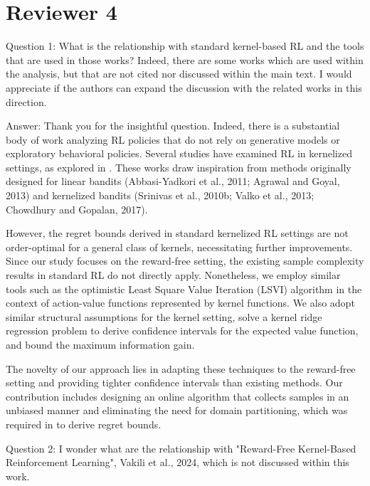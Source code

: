 \documentclass{article}
\begin{document}
\section*{Reviewer 4}

Question 1: What is the relationship with standard kernel-based RL and the tools that are used in those works? Indeed, there are some works which are used within the analysis, but that are not cited nor discussed within the main text. I would appreciate if the authors can expand the discussion with the related works in this direction.

Answer: Thank you for the insightful question. Indeed, there is a substantial body of work analyzing RL policies that do not rely on generative models or exploratory behavioral policies. Several studies have examined RL in kernelized settings, as explored in \cite{yang2020provably, yang2020reinforcement, chowdhury2019online, domingues2021kernel, vakili2024kernelized}. These works draw inspiration from methods originally designed for linear bandits (Abbasi-Yadkori et al., 2011; Agrawal and Goyal, 2013) and kernelized bandits (Srinivas et al., 2010b; Valko et al., 2013; Chowdhury and Gopalan, 2017).

However, the regret bounds derived in standard kernelized RL settings are not order-optimal for a general class of kernels, necessitating further improvements. Since our study focuses on the reward-free setting, the existing sample complexity results in standard RL do not directly apply. Nonetheless, we employ similar tools such as the optimistic Least Square Value Iteration (LSVI) algorithm \cite{vakili2024kernelized, yang2020provably} in the context of action-value functions represented by kernel functions. We also adopt similar structural assumptions for the kernel setting, solve a kernel ridge regression problem to derive confidence intervals for the expected value function, and bound the maximum information gain.

The novelty of our approach lies in adapting these techniques to the reward-free setting and providing tighter confidence intervals than existing methods. Our contribution includes designing an online algorithm that collects samples in an unbiased manner and eliminating the need for domain partitioning, which was required in \cite{vakili2024kernelized} to derive regret bounds.

Question 2: I wonder what are the relationship with "Reward-Free Kernel-Based Reinforcement Learning", Vakili et al., 2024, which is not discussed within this work.
\end{document}
